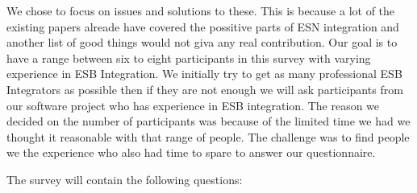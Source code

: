 \documentclass{llncs}
\begin{document}
We chose to focus on issues and solutions to these. This is because a lot of the existing papers alreade have covered the possitive parts of ESN integration and another list of good things would not giva any real contribution.
Our goal is to have a range between six to eight participants in this survey with varying experience in ESB Integration. We initially try to get as many professional ESB Integrators as possible then if they are not enough we will ask participants from our software project who has experience in ESB integration. The reason we decided on the number of participants was because of the limited time we had we thought it reasonable with that range of people. The challenge was to find people we the experience who also had time to spare to answer our questionnaire. 

The survey will contain the following questions:
\label{survey}
\end{document}
